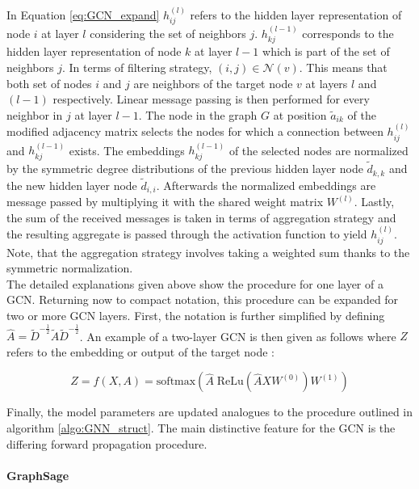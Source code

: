 	\noindent In Equation \ref{eq:GCN_expand} $h_{ij}^{(l)}$ refers to the 
	hidden layer representation of node $i$ at layer $l$ considering the set of
	neighbors $j$. $h_{kj}^{(l-1)}$ corresponds to the hidden layer
	representation of node $k$ at layer $l-1$ which is part of the set of 
	neighbors $j$. In terms of filtering strategy, $(i,j) \in \mathcal{N}(v)$. 
	This means that both set of nodes $i$ and $j$ are neighbors of the target 
	node $v$ at layers $l$ and $(l-1)$ respectively. Linear message
	passing is then performed for every neighbor in $j$ at layer $l-1$. The node 
	in the graph $G$ at position $\tilde a_{ik}$ of the modified adjacency matrix 
	selects the nodes for which a connection between $h_{ij}^{(l)}$ and
	$h_{kj}^{(l-1)}$ exists. The embeddings $h_{kj}^{(l-1)}$ of the selected 
	nodes are normalized by the symmetric degree distributions of the previous 
	hidden layer node $\tilde d_{k,k}$ and the new hidden layer node $\tilde d_{i,i}$.
	Afterwards the normalized embeddings are message passed by multiplying it
	with the shared weight matrix $W^{(l)}$. Lastly, the sum of the received
	messages is taken in terms of aggregation strategy and the resulting
	aggregate is passed through the activation function to yield $h_{ij}^{(l)}$.
	Note, that the aggregation strategy involves taking a weighted sum thanks
	to the symmetric normalization. \\

	\noindent The detailed explanations given above show the procedure for
	one layer of a GCN. Returning now to compact notation, this procedure can be
	expanded for two or more GCN layers. First, the notation is further
	simplified by defining $\hat A = \tilde D^{-\frac{1}{2}}\tilde A \tilde
	D^{-\frac{1}{2}}$. An example of a two-layer GCN is then given as follows 
	where $Z$ refers to the embedding or output of the target node 
	\citep[p. 3]{kipf2016semi}:

	\begin{equation}
		Z = f(X,A) = \text{softmax}\left(\hat A \;\text{ReLu}\left(\hat A X
		W^{(0)}\right)W^{(1)}\right)
	\end{equation}

	\noindent Finally, the model parameters are updated analogues to the
	procedure outlined in algorithm \ref{algo:GNN_struct}. The main distinctive
	feature for the GCN is the differing forward propagation procedure. 

	\paragraph{GraphSage} \mbox{}\\
	
